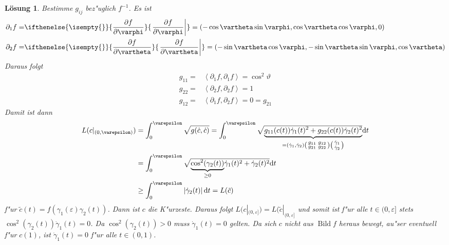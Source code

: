 \documentclass[paper=A4, twoside, chapterprefix=true, bibliography=totoc, headsepline]{scrbook}
\let\temp\phi
\let\phi\varphi
\let\varphi\temp
\let\temp\theta
\let\theta\vartheta
\let\vartheta\temp
\let\temp\epsilon
\let\epsilon\varepsilon
\let\varepsilon\temp
\let\temp\rho
\let\rho\varrho
\let\varrho\temp
\DeclareMathOperator{\Bild}{Bild}
\newcommand{\dop}{\mathrm{d}}
\newcommand{\pdifffrac}[3][]{\ifthenelse{\isempty{#1}}{\frac{\partial #2}{\partial #3}}{\left. \frac{\partial #2}{\partial #3} \right|_{#1}}}
\theoremstyle{plain}
\theoremstyle{nonumberplain}
\theoremstyle{empty}
\theoremstyle{break}
\newtheorem{Loes}{L\"osung}
\begin{document}
\begin{Loes}
Bestimme $g_{ij}$ bez"uglich $f^{-1}$. Es ist
\begin{align*}
	\partial_1 f = & \pdifffrac{f}{\phi} = \left( -\cos\theta \sin\phi, \cos\theta \cos\phi, 0 \right)\\
	\partial_2 f = & \pdifffrac{f}{\theta} = \left( -\sin\theta \cos\phi, -\sin\theta \sin\phi, \cos\theta \right)\\
\end{align*}
Daraus folgt
\begin{align*}
	g_{11} = & \left\langle \partial_1 f, \partial_1 f \right\rangle = \cos^2 \theta\\
	g_{22} = & \left\langle \partial_2 f, \partial_2 f \right\rangle = 1\\
	g_{12} = & \left\langle \partial_1 f, \partial_2 f \right\rangle = 0 = g_{21}
\end{align*}
Damit ist dann
\begin{align*}
	L(c|_{(0, \epsilon)}) &= \int_0^\epsilon \sqrt{g(\dot c, \dot c)} = \int_0^\epsilon \sqrt{\vphantom{g(\dot c, \dot c)} \smash{\underbrace{g_{11}(c(t)) \dot\gamma_1(t)^2 + g_{22}(c(t)) \dot\gamma_2(t)^2}_{= (\dot\gamma_1, \dot\gamma_2) \left(\begin{smallmatrix} g_{11} & g_{12} \\ g_{21} & g_{22} \end{smallmatrix}\right) \left(\begin{smallmatrix} \dot\gamma_1 \\ \dot\gamma_2 \end{smallmatrix}\right)}}} \dop t\\
	&= \int_0^\epsilon \sqrt{ \smash{\underbrace{\cos^2(\gamma_2(t))}_{\ge 0}} \dot\gamma_1(t)^2 + \dot\gamma_2(t)^2} \dop t \rule{0pt}{33pt}\\ %
	&\ge \int_0^\epsilon \left| \dot\gamma_2(t) \right| \dop t =L(\tilde c) \rule{0pt}{25pt}%
\end{align*}
f"ur $\tilde c(t) = f(\gamma_1(\epsilon) \gamma_2(t))$. Dann ist $c$ die K"urzeste. Daraus folgt $L(c|_{(0,\epsilon]}) = L(\tilde c|_{(0,\epsilon]}$ und somit ist f"ur alle $t \in (0,\epsilon]$ stets $\cos^2(\gamma_2(t)) \dot\gamma_1(t) = 0$. Da $\cos^2(\gamma_2(t)) > 0$ muss $\dot\gamma_1(t) = 0$ gelten. Da sich $c$ nicht aus $\Bild f$ heraus bewegt, au"ser eventuell f"ur $c(1)$, ist $\dot\gamma_1(t) = 0$ f"ur alle $t \in (0,1)$.
\end{Loes}
\end{document}
